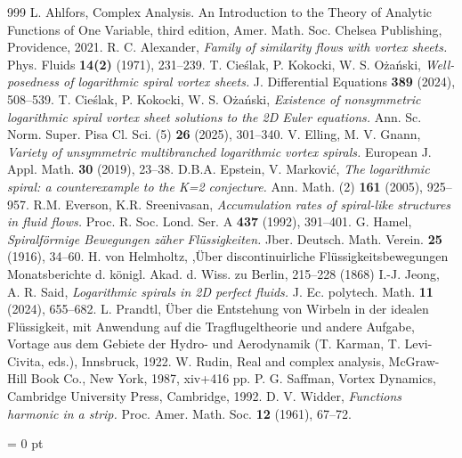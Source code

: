 \documentclass[11pt, letterpaper, reqno]{amsart}
\numberwithin{equation}{section}
\theoremstyle{definition}
\theoremstyle{plain}
\numberwithin{equation}{section}
\begin{document}
\begin{thebibliography}{999}
{\sc L. Ahlfors}, Complex Analysis. An Introduction to the Theory of Analytic Functions of One Variable,
third edition, Amer. Math. Soc. Chelsea Publishing, Providence, 2021.
{\sc R. C. Alexander}, {\it Family of similarity flows with vortex sheets.} Phys. Fluids {\bf 14(2)} (1971), 231--239.
{\sc T. Cie\'slak, P. Kokocki, W. S. O\.za\'nski}, {\it Well-posedness of logarithmic spiral vortex sheets.} J. Differential Equations {\bf 389} (2024), 508--539.
{\sc T. Cie\'slak, P. Kokocki, W. S. O\.za\'nski}, {\it Existence of nonsymmetric logarithmic spiral vortex sheet solutions to the 2D Euler equations.} Ann. Sc. Norm. Super. Pisa Cl. Sci. (5) {\bf 26} (2025), 301--340.
{\sc V. Elling, M. V. Gnann}, {\it Variety of unsymmetric multibranched logarithmic vortex
spirals.} European J. Appl. Math. {\bf 30} (2019), 23--38.
{\sc D.B.A. Epstein, V. Markovi\'c}, {\it The logarithmic spiral: a counterexample to the K=2 conjecture.} Ann. Math. (2) {\bf 161} (2005), 925--957.
{\sc R.M. Everson, K.R. Sreenivasan}, {\it Accumulation rates of spiral-like structures in fluid flows.} Proc. R. Soc. Lond. Ser.
A {\bf 437} (1992), 391--401.
{\sc G. Hamel}, {\it Spiralf\"{o}rmige Bewegungen z\"{a}her Fl\"{u}ssigkeiten.} Jber. Deutsch. Math. Verein. {\bf 25} (1916), 34--60.
{\sc H. von Helmholtz, },\"{U}ber discontinuirliche Fl\"{u}ssigkeitsbewegungen Monatsberichte d. k\"{o}nigl. Akad. d. Wiss. zu Berlin,
215--228 (1868)
{\sc I.-J. Jeong, A. R. Said}, {\it Logarithmic spirals in 2D perfect fluids.} J. Ec. polytech. Math. {\bf 11} (2024), 655--682.
{\sc L. Prandtl}, \"{U}ber die Entstehung von Wirbeln in der idealen Fl\"{u}ssigkeit, mit Anwendung auf die
Tragflugeltheorie und andere Aufgabe, Vortage aus dem Gebiete der Hydro- und Aerodynamik
(T. Karman, T. Levi-Civita, eds.), Innsbruck, 1922.
{\sc W. Rudin}, Real and complex analysis, McGraw-Hill Book Co., New York, 1987, xiv+416 pp.
{\sc P. G. Saffman}, Vortex Dynamics, Cambridge University Press, Cambridge, 1992.
{\sc D. V. Widder}, {\it Functions harmonic in a strip.} Proc. Amer. Math. Soc. {\bf 12} (1961), 67--72.

\end{thebibliography}
\parindent = 0 pt
\end{document}
